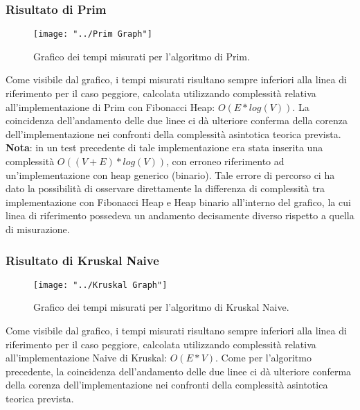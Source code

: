 \subsubsection{Risultato di Prim}
\begin{figure}[H]
	\centering
	\texttt{[image: "../Prim Graph"]}
	\caption[]{Grafico dei tempi misurati per l'algoritmo di Prim.}
	\label{fig:prim-graph}
\end{figure}
Come visibile dal grafico, i tempi misurati risultano sempre inferiori alla linea di riferimento per il caso peggiore, calcolata utilizzando complessità relativa all'implementazione di Prim con Fibonacci Heap: $O(E*log(V))$. La coincidenza dell'andamento delle due linee ci dà ulteriore conferma della corenza dell'implementazione nei confronti della complessità asintotica teorica prevista. \\

\textbf{Nota}: in un test precedente di tale implementazione era stata inserita una complessità $O((V + E)*log(V))$, con erroneo riferimento ad un'implementazione con heap generico (binario). Tale errore di percorso ci ha dato la possibilità di osservare direttamente la differenza di complessità tra implementazione con Fibonacci Heap e Heap binario all'interno del grafico, la cui linea di riferimento possedeva un andamento decisamente diverso rispetto a quella di misurazione.

\subsubsection{Risultato di Kruskal Naive}
\begin{figure}[H]
	\centering
	\texttt{[image: "../Kruskal Graph"]}
	\caption{Grafico dei tempi misurati per l'algoritmo di Kruskal Naive.}
	\label{fig:kruskal-graph}
\end{figure}
Come visibile dal grafico, i tempi misurati risultano sempre inferiori alla linea di riferimento per il caso peggiore, calcolata utilizzando complessità relativa all'implementazione Naive di Kruskal: $O(E*V)$. Come per l'algoritmo precedente, la coincidenza dell'andamento delle due linee ci dà ulteriore conferma della corenza dell'implementazione nei confronti della complessità asintotica teorica prevista.

\pagebreak

